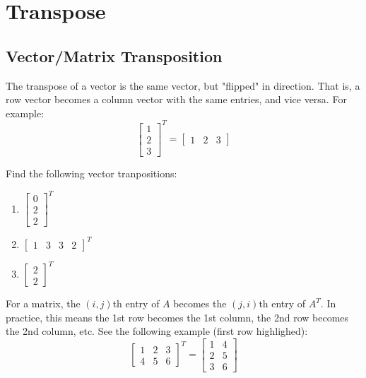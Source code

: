 \documentclass[11pt]{exam}
\begin{document}
\pagebreak
\section{Transpose}

    \vspace{20px}
    \subsection{Vector/Matrix Transposition}
        The transpose of a vector is the same vector, but "flipped" in direction. That is, a row vector becomes a column vector with the same
        entries, and vice versa. For example:
        $$\begin{bmatrix} 1 \\ 2 \\ 3 \end{bmatrix}^T = \begin{bmatrix} 1 & 2 & 3 \end{bmatrix}$$

        \begin{questions}
            \item Find the following vector tranpositions:
            \begin{enumerate}
                \item $\begin{bmatrix} 0 \\ 2 \\ 2 \end{bmatrix}^T$
                \item $\begin{bmatrix} 1 & 3 & 3 & 2 \end{bmatrix}^T$
                \item $\begin{bmatrix} 2 \\ 2 \end{bmatrix}^T$
            \end{enumerate}
        \end{questions}

        For a matrix, the $(i,j)$th entry of $A$ becomes the $(j,i)$th entry of $A^T$. In practice, this means the 1st row becomes the 1st column,
        the 2nd row becomes the 2nd column, etc. See the following example (first row highlighed):
        $$\begin{bmatrix} \boxed{1} & \boxed{2} & \boxed{3} \\ 4 & 5 & 6 \end{bmatrix}^T =
        \begin{bmatrix} \boxed{1} & 4 \\ \boxed{2} & 5 \\ \boxed{3} & 6 \end{bmatrix}$$
\end{document}
